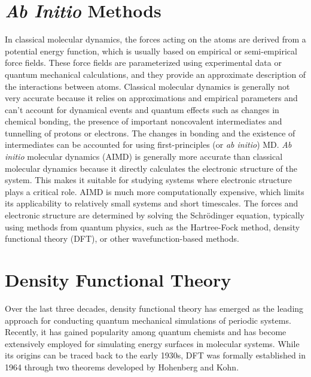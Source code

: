 \section{\textit{Ab Initio} Methods}
In classical molecular dynamics, the forces acting on the atoms are derived
from a potential energy function, which is usually based on empirical or
semi-empirical force fields. These force fields are parameterized using
experimental data or quantum mechanical calculations, and they provide an
approximate description of the interactions between atoms. Classical molecular
dynamics is generally not very accurate because it relies on approximations
and empirical parameters and can't account for dynamical events and quantum
effects such as changes in chemical bonding, the presence of important
noncovalent intermediates and tunnelling of protons or electrons. The changes
in bonding and the existence of intermediates can be accounted for using
first-principles (or \textit{ab initio}) MD. \textit{Ab initio} molecular
dynamics (AIMD) is generally more accurate than classical molecular dynamics
because it directly calculates the electronic structure of the system. This
makes it suitable for studying systems where electronic structure plays a
critical role. AIMD is much more computationally expensive, which limits its
applicability to relatively small systems and short timescales. The forces and
electronic structure are determined by solving the Schrödinger equation,
typically using methods from quantum physics, such as the Hartree-Fock method,
density functional theory (DFT), or other wavefunction-based methods.

\section{Density Functional Theory}
Over the last three decades, density functional theory has emerged as the
leading approach for conducting quantum mechanical simulations of periodic
systems. Recently, it has gained popularity among quantum chemists and has
become extensively employed for simulating energy surfaces in molecular
systems. While its origins can be traced back to the early 1930s, DFT was
formally established in 1964 through two theorems developed by Hohenberg and
Kohn.

